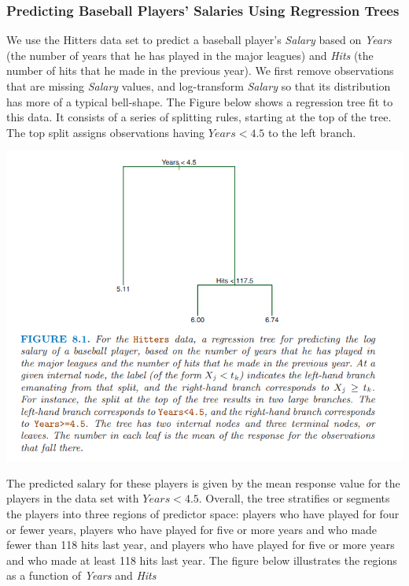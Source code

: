 \subsubsection{Predicting Baseball Players’ Salaries Using Regression Trees}
We use the Hitters data set to predict a baseball player’s \textit{Salary} based on \textit{Years} (the number of years that he has played in the major leagues) and \textit{Hits} (the number of hits that he made in the previous year). We first remove observations that are missing \textit{Salary} values, and log-transform \textit{Salary} so that its distribution has more of a typical bell-shape. The Figure below  shows a regression tree fit to this data. It consists of a series of splitting rules, starting at the top of the tree. The top split assigns observations having $Years<4.5$ to the left branch.
\begin{center}
    \includegraphics[scale=0.7]{images/reg-tree.png}
\end{center}
The predicted salary for these players is given by the mean response value for the players in the data set with $Years<4.5$. Overall, the tree stratifies
or segments the players into three regions of predictor space: players who have played for four or fewer years, players who have played for five or more years and who made fewer than 118 hits last year, and players who have played for five or more years and who made at least 118 hits last year. The figure below  illustrates the regions as a function of \textit{Years} and \textit{Hits}
